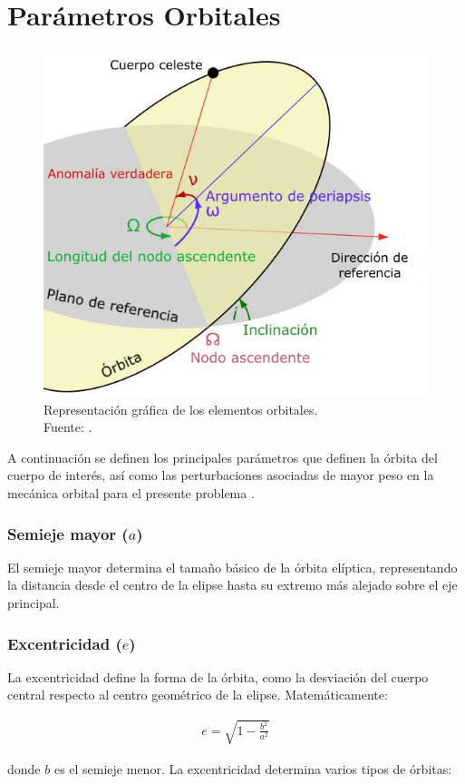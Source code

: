 \section{Parámetros Orbitales}


\begin{figure}[H]
    \centering
    \includegraphics[width=0.5\linewidth]{3.Conceptos_Previos/Elementos_orbitales.jpg}
    \caption{Representación gráfica de los elementos orbitales. \\ Fuente: \cite{WikiElementosOrbitales}.
}
\end{figure}

A continuación se definen los principales parámetros que definen la órbita del cuerpo de interés, así como las perturbaciones asociadas de mayor peso en la mecánica orbital para el presente problema \cite{curtis2020orbital}.

\subsubsection*{Semieje mayor ($a$)}

El semieje mayor determina el tamaño básico de la órbita elíptica, representando la distancia desde el centro de la elipse hasta su extremo más alejado sobre el eje principal.

\subsubsection*{Excentricidad ($e$)}

La excentricidad define la forma de la órbita, como la desviación del cuerpo central respecto al centro geométrico de la elipse. Matemáticamente:

\begin{align}
e = \sqrt{1 - \frac{b^2}{a^2}}
\end{align}

donde \( b \) es el semieje menor. La excentricidad determina varios tipos de órbitas:

